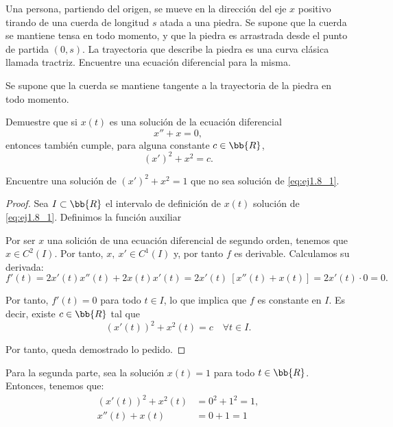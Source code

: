 \begin{ejercicio}
    Una persona, partiendo del origen, se mueve en la dirección del eje \(x\) positivo tirando de una cuerda de longitud \(s\) atada a una piedra.
    Se supone que la cuerda se mantiene tensa en todo momento, y que la piedra es arrastrada desde el punto de partida \((0, s)\).
    La trayectoria que describe la piedra es una curva clásica llamada tractriz.
    Encuentre una ecuación diferencial para la misma.
    \begin{observacion}
        Se supone que la cuerda se mantiene tangente a la trayectoria de la piedra en todo momento.
    \end{observacion}
\end{ejercicio}


\begin{ejercicio}
    Demuestre que si \(x(t)\) es una solución de la ecuación diferencial
    \begin{equation}\label{eq:ej1.8_1}
        x'' + x = 0,
    \end{equation}
    entonces también cumple, para alguna constante \(c \in \bb{R}\),
    \begin{equation}\label{eq:ej1.8_2}
        (x')^2 + x^2 = c.
    \end{equation}

    Encuentre una solución de $(x')^2 + x^2 = 1$ que no sea solución de \eqref{eq:ej1.8_1}.\\

    \begin{proof}
        Sea $I\subset \bb{R}$ el intervalo de definición de $x(t)$ solución de \eqref{eq:ej1.8_1}. Definimos la función auxiliar

        Por ser $x$ una solición de una ecuación diferencial de segundo orden, tenemos que $x\in C^2(I)$. Por tanto, $x,~x'\in C^1(I)$ y, por tanto $f$ es derivable. Calculamos su derivada:
        \begin{equation*}
            f'(t) = 2x'(t)x''(t) + 2x(t)x'(t) = 2x'(t)~\left[ x''(t) + x(t) \right] = 2x'(t)\cdot 0 = 0.
        \end{equation*}

        Por tanto, $f'(t)=0$ para todo $t\in I$, lo que implica que $f$ es constante en $I$. Es decir, existe $c\in \bb{R}$ tal que
        \begin{equation*}
            (x'(t))^2 + x^2(t) = c \quad \forall t\in I.
        \end{equation*}

        Por tanto, queda demostrado lo pedido.
    \end{proof}

    Para la segunda parte, sea la solución $x(t) = 1$ para todo $t\in \bb{R}$. Entonces, tenemos que:
    \begin{align*}
        (x'(t))^2 + x^2(t) &= 0^2 + 1^2 = 1,\\
        x''(t) + x(t) &= 0 + 1 = 1
    \end{align*}
\end{ejercicio}



